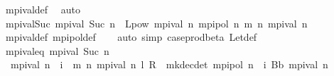 \begin{isabellebody}
\ mpi{\isacharunderscore}{\kern0pt}val{\isacharunderscore}{\kern0pt}def\ \isamarkupfalse%
\ auto%
\endisatagproof
{\isafoldproof}%
%
\isadelimproof
\isanewline
%
\endisadelimproof
\isanewline
{}\isamarkupfalse%
\ mpi{\isacharunderscore}{\kern0pt}val{\isacharunderscore}{\kern0pt}Suc{\isacharcolon}{\kern0pt}\ {\isachardoublequoteopen}mpi{\isacharunderscore}{\kern0pt}val\ {\isacharparenleft}{\kern0pt}Suc\ n{\isacharparenright}{\kern0pt}\ {\isacharequal}{\kern0pt}\ L{\isacharunderscore}{\kern0pt}pow\ {\isacharparenleft}{\kern0pt}mpi{\isacharunderscore}{\kern0pt}val\ n{\isacharparenright}{\kern0pt}\ {\isacharparenleft}{\kern0pt}mpi{\isacharunderscore}{\kern0pt}pol\ n{\isacharparenright}{\kern0pt}\ {\isacharparenleft}{\kern0pt}m\ n\ {\isacharparenleft}{\kern0pt}mpi{\isacharunderscore}{\kern0pt}val\ n{\isacharparenright}{\kern0pt}{\isacharparenright}{\kern0pt}{\isachardoublequoteclose}\isanewline
%
\isadelimproof
\ \ %
\endisadelimproof
%
\isatagproof
{}\isamarkupfalse%
\ mpi{\isacharunderscore}{\kern0pt}val{\isacharunderscore}{\kern0pt}def\ mpi{\isacharunderscore}{\kern0pt}pol{\isacharunderscore}{\kern0pt}def\isanewline
\ \ \isamarkupfalse%
\ {\isacharparenleft}{\kern0pt}auto\ simp{\isacharcolon}{\kern0pt}\ case{\isacharunderscore}{\kern0pt}prod{\isacharunderscore}{\kern0pt}beta{\isacharprime}{\kern0pt}\ Let{\isacharunderscore}{\kern0pt}def{\isacharparenright}{\kern0pt}%
\endisatagproof
{\isafoldproof}%
%
\isadelimproof
\isanewline
%
\endisadelimproof
\isanewline
{}\isamarkupfalse%
\ mpi{\isacharunderscore}{\kern0pt}val{\isacharunderscore}{\kern0pt}eq{\isacharcolon}{\kern0pt}\ {\isachardoublequoteopen}mpi{\isacharunderscore}{\kern0pt}val\ {\isacharparenleft}{\kern0pt}Suc\ n{\isacharparenright}{\kern0pt}\ {\isacharequal}{\kern0pt}\ \isanewline
\ \ mpi{\isacharunderscore}{\kern0pt}val\ n\ {\isacharplus}{\kern0pt}\ {\isacharparenleft}{\kern0pt}{\isasymSum}i\ {\isasymle}\ m\ n\ {\isacharparenleft}{\kern0pt}mpi{\isacharunderscore}{\kern0pt}val\ n{\isacharparenright}{\kern0pt}{\isachardot}{\kern0pt}\ {\isacharparenleft}{\kern0pt}l\ {\isacharasterisk}{\kern0pt}\isactrlsub R\ {\isasymP}\ {\isacharparenleft}{\kern0pt}mk{\isacharunderscore}{\kern0pt}dec{\isacharunderscore}{\kern0pt}det\ {\isacharparenleft}{\kern0pt}mpi{\isacharunderscore}{\kern0pt}pol\ n{\isacharparenright}{\kern0pt}{\isacharparenright}{\kern0pt}{\isacharparenright}{\kern0pt}\ {\isacharcircum}{\kern0pt}{\isacharcircum}{\kern0pt}\ i{\isacharparenright}{\kern0pt}\ {\isacharparenleft}{\kern0pt}B\isactrlsub b\ {\isacharparenleft}{\kern0pt}mpi{\isacharunderscore}{\kern0pt}val\ n{\isacharparenright}{\kern0pt}{\isacharparenright}{\kern0pt}{\isachardoublequoteclose}\ \ \isanewline

\end{isabellebody}
